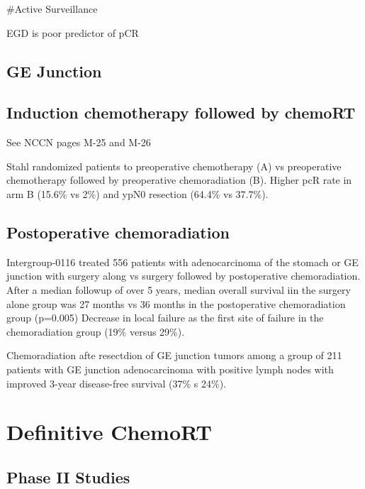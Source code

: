 \documentclass[
]{book}
\begin{document}
\#Active Surveillance

EGD is poor predictor of pCR \citep{sarkaria764}

\hypertarget{ge-junction}{%
\section{GE Junction}\label{ge-junction}}

\citep{siewert260}

\hypertarget{induction-chemotherapy-followed-by-chemort}{%
\section{Induction chemotherapy followed by chemoRT}\label{induction-chemotherapy-followed-by-chemort}}

See NCCN pages M-25 and M-26

Stahl \citep{stahl851} randomized patients to preoperative chemotherapy (A) vs preoperative chemotherapy followed by preoperative chemoradiation (B). Higher pcR rate in arm B (15.6\% vs 2\%) and ypN0 resection (64.4\% vs 37.7\%).

\hypertarget{postoperative-chemoradiation}{%
\section{Postoperative chemoradiation}\label{postoperative-chemoradiation}}

Intergroup-0116 \citep{macdonald725} \citep{smalley2327} treated 556 patients with adenocarcinoma of the stomach or GE junction with surgery along vs surgery followed by postoperative chemoradiation. After a median followup of over 5 years, median overall survival iin the surgery alone group was 27 months vs 36 months in the postoperative chemoradiation group (p=0.005) Decrease in local failure as the first site of failure in the chemoradiation group (19\% versus 29\%).

Chemoradiation afte resectdion of GE junction tumors \citep{kofoed26} among a group of 211 patients with GE junction adenocarcinoma with positive lymph nodes with improved 3-year disease-free survival (37\% s 24\%).

\hypertarget{definitive-chemort}{%
\chapter{Definitive ChemoRT}\label{definitive-chemort}}

\hypertarget{phase-ii-studies}{%
\section{Phase II Studies}\label{phase-ii-studies}}
\end{document}
